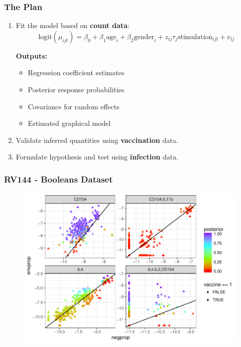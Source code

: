 \documentclass{beamer}
\makeatletter
\def\maxwidth{ %
  \ifdim\Gin@nat@width>\linewidth
    \linewidth
  \else
    \Gin@nat@width
  \fi
}
\theoremstyle{definition}
\makeatother
\begin{document}

\begin{frame}
\frametitle{The Plan}
\begin{enumerate}
\item Fit the model based on \textbf{count data}:
$$
\text{logit}(\mu_{ijt}) = \beta_0 + \beta_1\text{age}_i + \beta_2\text{gender}_i + z_{ij}\tau_{j}\text{stimulation}_{ijt} + \nu_{ij}
$$

\textbf{Outputs:}
	\begin{itemize}
	\item Regression coefficient estimates
	\item Posterior response probabilities
	\item Covariance for random effects
	\item Estimated graphical model
	\end{itemize}

\pause
\vspace{0.5 cm}
\item Validate inferred quantities using \textbf{vaccination} data.
 
 \vspace{0.5 cm}
\item Formulate hypothesis and test using \textbf{infection} data. 
\end{enumerate}
\end{frame}


\begin{frame}
\frametitle{RV144 - Booleans Dataset}
\begin{figure}[]
\includegraphics[width=\maxwidth]{figures/updatedRV144scatter} 
\end{figure}
\end{frame}
\end{document}
